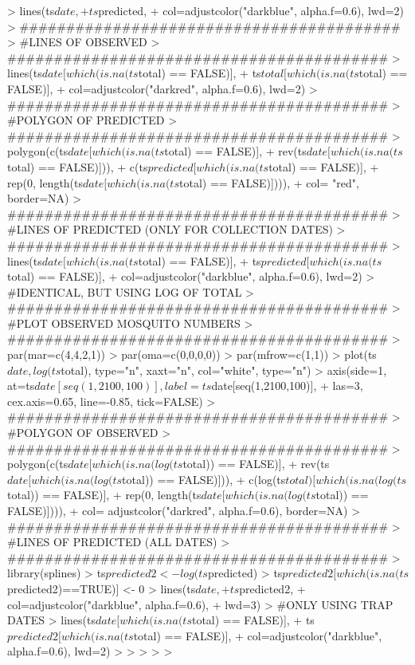 \documentclass{article}
\begin{document}
\begin{Schunk}
\begin{Sinput}
> lines(ts$date,
+       ts$predicted,
+       col=adjustcolor("darkblue", alpha.f=0.6), lwd=2)
> #########################################
> #LINES OF OBSERVED
> #########################################
> lines(ts$date[which(is.na(ts$total) == FALSE)], 
+       ts$total[which(is.na(ts$total) == FALSE)],
+       col=adjustcolor("darkred", alpha.f=0.6), lwd=2)
> #########################################
> #POLYGON OF PREDICTED
> #########################################
> polygon(c(ts$date[which(is.na(ts$total) == FALSE)], 
+           rev(ts$date[which(is.na(ts$total) == FALSE)])), 
+         c(ts$predicted[which(is.na(ts$total) == FALSE)], 
+           rep(0, length(ts$date[which(is.na(ts$total) == FALSE)]))), 
+         col= "red", border=NA)
> #########################################
> #LINES OF PREDICTED (ONLY FOR COLLECTION DATES)
> #########################################
> lines(ts$date[which(is.na(ts$total) == FALSE)],
+       ts$predicted[which(is.na(ts$total) == FALSE)],
+       col=adjustcolor("darkblue", alpha.f=0.6), lwd=2)
> #IDENTICAL, BUT USING LOG OF TOTAL
> #########################################
> #PLOT OBSERVED MOSQUITO NUMBERS
> #########################################
> par(mar=c(4,4,2,1))
> par(oma=c(0,0,0,0))
> par(mfrow=c(1,1))
> plot(ts$date, log(ts$total), type="n", xaxt="n", col="white", type="n")
> axis(side=1, at=ts$date[seq(1,2100,100)], label=ts$date[seq(1,2100,100)],
+      las=3, cex.axis=0.65, line=-0.85, tick=FALSE)
> #########################################
> #POLYGON OF OBSERVED
> #########################################
> polygon(c(ts$date[which(is.na(log(ts$total)) == FALSE)], 
+           rev(ts$date[which(is.na(log(ts$total)) == FALSE)])), 
+         c(log(ts$total)[which(is.na(log(ts$total)) == FALSE)], 
+           rep(0, length(ts$date[which(is.na(log(ts$total)) == FALSE)]))), 
+         col= adjustcolor("darkred", alpha.f=0.6), border=NA)
> #########################################
> #LINES OF PREDICTED (ALL DATES)
> #########################################
> library(splines)
> ts$predicted2 <- log(ts$predicted)
> ts$predicted2[which(is.na(ts$predicted2)==TRUE)] <- 0
> lines(ts$date,
+       ts$predicted2,
+       col=adjustcolor("darkblue", alpha.f=0.6),
+       lwd=3)
> #ONLY USING TRAP DATES
> lines(ts$date[which(is.na(ts$total) == FALSE)],
+       ts$predicted2[which(is.na(ts$total) == FALSE)],
+       col=adjustcolor("darkblue", alpha.f=0.6), lwd=2)
> 
> 
> 
> 
> 
\end{Sinput}
\end{Schunk}
\end{document}
